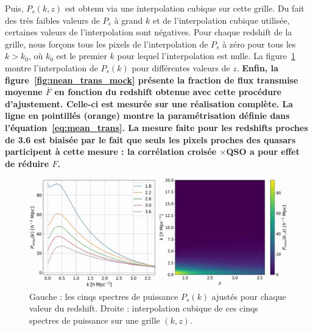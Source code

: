 Puis, $P_{s}(k,z)$ est obtenu via une interpolation cubique sur cette grille. Du fait des très faibles valeurs de $P_{s}$ à grand $k$ et de l'interpolation cubique utilisée, certaines valeurs de l'interpolation sont négatives. Pour chaque redshift de la grille, nous forçons tous les pixels de l'interpolation de $P_{s}$ à zéro pour tous les $k > k_0$, où $k_0$ est le premier $k$ pour lequel l'interpolation est nulle. La figure~\ref{fig:p1dmiss} montre l'interpolation de $P_{s}(k)$ pour différentes valeurs de $z$.
\textbf{Enfin, la figure~\ref{fig:mean_trans_mock} présente la fraction de flux transmise moyenne $\overline F$ en fonction du redshift obtenue avec cette procédure d'ajustement. Celle-ci est mesurée sur une réalisation complète. La ligne en pointillés (orange) montre la paramétrisation définie dans l'équation~\ref{eq:mean_trans}. La mesure faite pour les redshifts proches de \num{3.6} est biaisée par le fait que seuls les pixels proches des quasars participent à cette mesure : la corrélation croisée \lya{}$\times$QSO a pour effet de réduire $F$.}
\begin{figure}
  \centering
  \includegraphics[scale=0.4]{p1dmiss}
  \caption{Gauche : les cinqs spectres de puissance $P_{s}(k)$ ajustés pour chaque valeur du redshift. Droite : interpolation cubique de ces cinqs spectres de puissance sur une grille $(k, z)$.}
  \label{fig:p1dmiss}
\end{figure}
